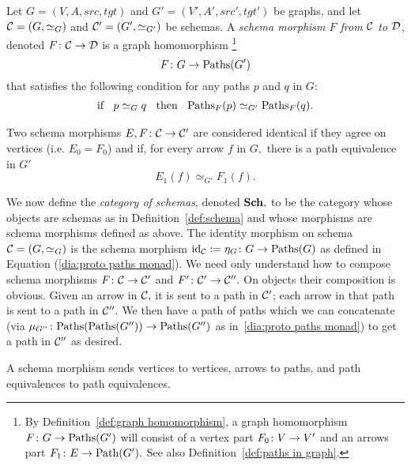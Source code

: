 \documentclass[CT4S-EN-RU]{subfiles}
\begin{document}
\begin{definitionENG}\label{def:schema morphism}
Let $G=(V,A,src,tgt)$ and $G'=(V',A',src',tgt')$ be graphs, and let $\mathcal{C}=(G,\simeq_G)$ and $\mathcal{C}'=(G',\simeq_{G'})$ be schemas. A {\em schema morphism $F$ from $\mathcal{C}$ to $\mathcal{D}$}, denoted $F\colon\mathcal{C}\rightarrow\mathcal{D}$ is a graph homomorphism 
\footnote{By Definition~\ref{def:graph homomorphism}, a graph homomorphism $F\colon G\rightarrow\textnormal{Paths}(G')$ will consist of a vertex part $F_0\colon V\rightarrow V'$ and an arrows part $F_1\colon E\rightarrow\textnormal{Path}(G').$ See also Definition~\ref{def:paths in graph}.}
$$F\colon G\rightarrow\textnormal{Paths}(G')$$ that satisfies the following condition for any paths $p$ and $q$ in $G$: 
\begin{align}\label{dia:path cond for schema morphism}
\textnormal{if \;\;$p\simeq_G q$ \;\;then\;\; $\textnormal{Paths}_F(p)\simeq_{G'}\textnormal{Paths}_F(q)$}.
\end{align}

Two schema morphisms $E,F\colon\mathcal{C}\rightarrow\mathcal{C}'$ are considered identical if they agree on vertices (i.e. $E_0=F_0$) and if, for every arrow $f$ in $G,$ there is a path equivalence in $G'$ $$E_1(f)\simeq_{G'}F_1(f).$$

We now define the {\em category of schemas}, denoted ${\mathbf{Sch}},$ to be the category whose objects are schemas as in Definition~\ref{def:schema} and whose morphisms are schema morphisms defined as above. The identity morphism on schema $\mathcal{C}=(G,\simeq_G)$ is the schema morphism $\textnormal{id}_\mathcal{C}:=\eta_G\colon G\rightarrow\textnormal{Paths}(G)$ as defined in Equation (\ref{dia:proto paths monad}). We need only understand how to compose schema morphisms $F\colon\mathcal{C}\rightarrow\mathcal{C}'$ and $F'\colon\mathcal{C}'\rightarrow\mathcal{C}''.$ On objects their composition is obvious. Given an arrow in $\mathcal{C},$ it is sent to a path in $\mathcal{C}'$; each arrow in that path is sent to a path in $\mathcal{C}''.$ We then have a path of paths which we can concatenate (via $\mu_{G''}\colon\textnormal{Paths}(\textnormal{Paths}(G''))\rightarrow\textnormal{Paths}(G'')$ as in~\ref{dia:proto paths monad}) to get a path in $\mathcal{C}''$ as desired.
\end{definitionENG}

\begin{definitionRUS}\label{def:schema morphism}
\end{definitionRUS}

\begin{sloganENG}
A schema morphism sends vertices to vertices, arrows to paths, and path equivalences to path equivalences.
\end{sloganENG}
\end{document}
